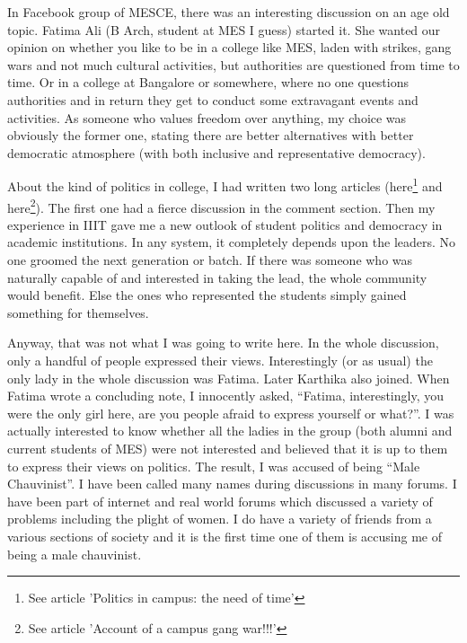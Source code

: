 \vskip 2pt

In Facebook group of MESCE, there was an interesting discussion on an age old topic. 
Fatima Ali (B Arch, student at MES I guess) started it. She wanted our opinion on whether 
you like to be in a college like MES, laden with strikes, gang wars and not much cultural 
activities, but authorities are questioned from time to time. Or in a college at Bangalore 
or somewhere, where no one questions authorities and in return they get to conduct some 
extravagant events and activities. As someone who values freedom over anything, my 
choice was obviously the former one, stating there are better alternatives with better 
democratic atmosphere (with both inclusive and representative democracy).

About the kind of politics in college, I had written two long articles (here\footnote{See article 'Politics in campus: the need of time'} 
and here\footnote{See article 'Account of a campus gang war!!!'}). The first one had a fierce discussion in the comment section. 
Then my experience in IIIT gave me a new outlook of student politics and democracy in academic institutions. 
In any system, it completely depends upon the leaders. No one groomed the next generation or batch. If there 
was someone who was naturally capable of and interested in taking the lead, the whole community would 
benefit. Else the ones who represented the students simply gained something for themselves.

Anyway, that was not what I was going to write here. In the whole discussion, only a handful of people 
expressed their views. Interestingly (or as usual) the only lady in the whole discussion was Fatima. Later 
Karthika also joined. When Fatima wrote a concluding note, I innocently asked, ``Fatima, interestingly, you 
were the only girl here, are you people afraid to express yourself or what?''. I was actually interested to 
know whether all the ladies in the group (both alumni and current students of MES) were not interested 
and believed that it is up to them to express their views on politics. The result, I was accused of being 
``Male Chauvinist''. I have been called many names during discussions in many forums. I have been 
part of internet and real world forums which discussed a variety of problems including the plight of 
women. I do have a variety of friends from a various sections of society and it is the first time one of 
them is accusing me of being a male chauvinist.

